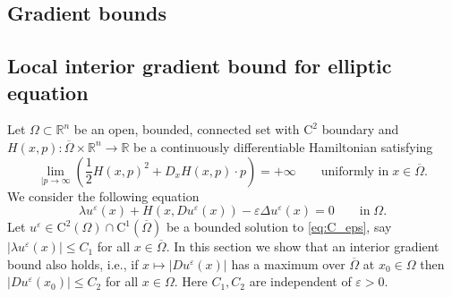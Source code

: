 \documentclass[11pt,reqno]{amsart}
\numberwithin{figure}{section}
\theoremstyle{plain}
\theoremstyle{remark}
\numberwithin{equation}{section}
\newcommand{\R}{\mathbb{R}}
\newcommand{\rmC}{\mathrm{C}}
\begin{document}
\begin{appendices}



\section{Gradient bounds}
\subsection{Local interior gradient bound for elliptic equation}
Let $\Omega\subset \R^n$ be an open, bounded, connected set with $\rmC^2$ boundary and $H(x,p):\overline{\Omega}\times \R^n\rightarrow \mathbb{R}$ be a continuously differentiable Hamiltonian satisfying
\begin{equation}\label{eq:grow}
\lim_{|p\rightarrow \infty} \left(\frac{1}{2}H(x,p)^2 + D_xH(x,p)\cdot p\right) = +\infty \qquad\text{uniformly in}\;x\in \overline{\Omega}. \tag{H1}
\end{equation}
We consider the following equation
\begin{equation}\label{eq:C_eps}
    \lambda u^\varepsilon(x) + H(x,Du^\varepsilon(x)) - \varepsilon \Delta u^\varepsilon(x) = 0 \qquad\text{in}\;\Omega.
\end{equation}
Let $u^\varepsilon\in \rmC^2(\Omega)\cap \mathrm{C}^1(\overline{\Omega})$ be a bounded solution to \eqref{eq:C_eps}, say $|\lambda u^\varepsilon(x)| \leq C_1$ for all $x\in \overline{\Omega}$. In this section we show that an interior gradient bound also holds, i.e., if $x\mapsto|Du^\varepsilon(x)|$ has a maximum over $\overline{\Omega}$ at $x_0\in \Omega$ then $|Du^\varepsilon(x_0)| \leq C_2$ for all $x\in \Omega$. Here $C_1,C_2$ are independent of $\varepsilon>0$.\\



\end{appendices}
\end{document}
